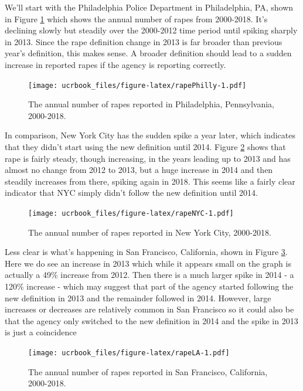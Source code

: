\documentclass[
  12pt,
  openany]{book}
\begin{document}
We'll start with the Philadelphia Police Department in Philadelphia, PA, shown in Figure \ref{fig:rapePhilly} which shows the annual number of rapes from 2000-2018. It's declining slowly but steadily over the 2000-2012 time period until spiking sharply in 2013. Since the rape definition change in 2013 is far broader than previous year's definition, this makes sense. A broader definition should lead to a sudden increase in reported rapes if the agency is reporting correctly.

\begin{figure}
\centering
\texttt{[image: ucrbook\_files/figure-latex/rapePhilly-1.pdf]}
\caption{\label{fig:rapePhilly}The annual number of rapes reported in Philadelphia, Pennsylvania, 2000-2018.}
\end{figure}

In comparison, New York City has the sudden spike a year later, which indicates that they didn't start using the new definition until 2014. Figure \ref{fig:rapeNYC} shows that rape is fairly steady, though increasing, in the years leading up to 2013 and has almost no change from 2012 to 2013, but a huge increase in 2014 and then steadily increases from there, spiking again in 2018. This seems like a fairly clear indicator that NYC simply didn't follow the new definition until 2014.

\begin{figure}
\centering
\texttt{[image: ucrbook\_files/figure-latex/rapeNYC-1.pdf]}
\caption{\label{fig:rapeNYC}The annual number of rapes reported in New York City, 2000-2018.}
\end{figure}

Less clear is what's happening in San Francisco, California, shown in Figure \ref{fig:rapeLA}.
Here we do see an increase in 2013 which while it appears small on the graph is actually a 49\% increase from 2012. Then there is a much larger spike in 2014 - a 120\% increase - which may suggest that part of the agency started following the new definition in 2013 and the remainder followed in 2014. However, large increases or decreases are relatively common in San Francisco so it could also be that the agency only switched to the new definition in 2014 and the spike in 2013 is just a coincidence

\begin{figure}
\centering
\texttt{[image: ucrbook\_files/figure-latex/rapeLA-1.pdf]}
\caption{\label{fig:rapeLA}The annual number of rapes reported in San Francisco, California, 2000-2018.}
\end{figure}
\end{document}
